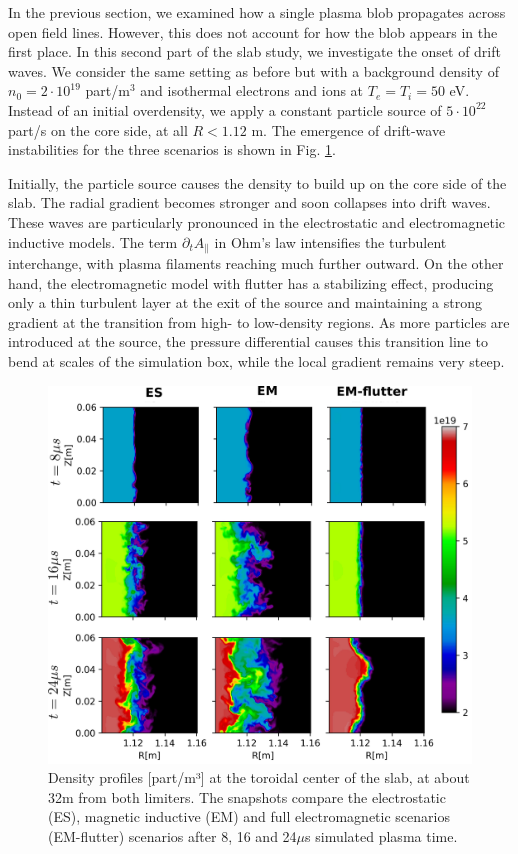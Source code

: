 In the previous section, we examined how a single plasma blob propagates across open field lines. However, this does not account for how the blob appears in the first place. In this second part of the slab study, we investigate the onset of drift waves. We consider the same setting as before but with a background density of $n_0 = 2 \cdot 10^{19}$ part/m$^3$ and isothermal electrons and ions at $T_e = T_i = 50$ eV. Instead of an initial overdensity, we apply a constant particle source of $5 \cdot 10^{22}$ part/s on the core side, at all $R < 1.12$ m. The emergence of drift-wave instabilities for the three scenarios is shown in Fig. \ref{fig:SLABturb}. \newline

Initially, the particle source causes the density to build up on the core side of the slab. The radial gradient becomes stronger and soon collapses into drift waves. These waves are particularly pronounced in the electrostatic and electromagnetic inductive models. The term $\partial_t A_\parallel$ in Ohm's law intensifies the turbulent interchange, with plasma filaments reaching much further outward. On the other hand, the electromagnetic model with flutter has a stabilizing effect, producing only a thin turbulent layer at the exit of the source and maintaining a strong gradient at the transition from high- to low-density regions. As more particles are introduced at the source, the pressure differential causes this transition line to bend at scales of the simulation box, while the local gradient remains very steep. \newline

\begin{figure}[H]\centering
	\centering
	\includegraphics[width=.95\textwidth]{schemes/slab_source.png}
	\caption{Density profiles [part/m³] at the toroidal center of the slab, at about 32m from both limiters. The snapshots compare the electrostatic (ES), magnetic inductive (EM) and full electromagnetic scenarios (EM-flutter) scenarios after 8, 16 and 24$\mu$s simulated plasma time.}
	\label{fig:SLABturb}
\end{figure}


